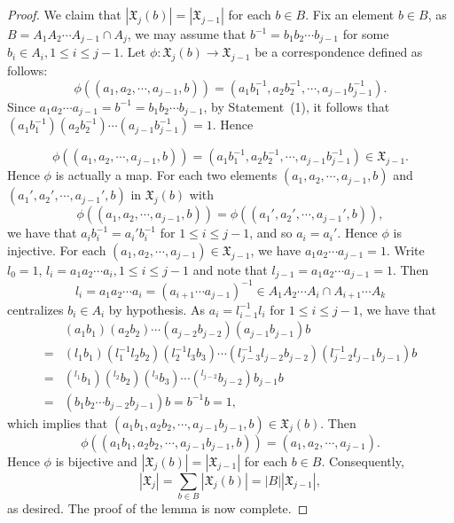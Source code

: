 \documentclass[10pt,a4paper]{amsart}
\newcommand\XX{\mathfrak{X}}
\begin{document}
\begin{proof}
We claim that $|\XX_j(b)|=|\XX_{j-1}|$ for each $b \in B$. Fix an element $b \in B$, as $B=A_1A_2\cdots A_{j-1} \cap A_j$, we may assume that $b^{-1}=b_1b_2\cdots b_{j-1}$ for some $b_i \in A_i, 1\leq i \leq j-1$. Let
$\phi: \XX_j(b) \rightarrow \XX_{j-1}$ be a correspondence defined as follows:
$$\phi((a_1,a_2,\cdots, a_{j-1}, b))=(a_1b_1^{-1}, a_2b_2^{-1}, \cdots, a_{j-1}b_{j-1}^{-1}).$$
Since $a_1a_2\cdots a_{j-1}=b^{-1}=b_1b_2\cdots b_{j-1}$, by Statement~(1), it follows that $(a_1b_1^{-1})(a_2b_2^{-1})\cdots(a_{j-1}b_{j-1}^{-1})=1$. Hence

$$\phi((a_1,a_2,\cdots, a_{j-1}, b))=(a_1b_1^{-1}, a_2b_2^{-1}, \cdots, a_{j-1}b_{j-1}^{-1}) \in \XX_{j-1}.$$
Hence $\phi$ is actually a map. For each two elements $(a_1,a_2,\cdots,a_{j-1},b)$ and $(a_1',a_2',\cdots,a_{j-1}',b)$ in $\XX_j(b)$ with
$$\phi((a_1,a_2,\cdots,a_{j-1},b))=\phi((a_1',a_2',\cdots,a_{j-1}',b)),$$
we have that $a_ib_i^{-1}=a_i'b_i^{-1}$ for $1 \leq i \leq j-1$, and so $a_i=a_i'$. Hence $\phi$ is injective.  For each $(a_1,a_2,\cdots, a_{j-1}) \in \XX_{j-1}$,
we have $a_1a_2\cdots a_{j-1}=1$.
Write $l_0=1$, $l_i=a_1 a_2\cdots a_{i}, 1\leq i \leq j-1$ and note that $l_{j-1}=a_1 a_2\cdots a_{j-1}=1$. Then
$$l_i=a_1a_2\cdots a_{i}=(a_{i+1}\cdots a_{j-1})^{-1} \in A_1A_2\cdots A_i \cap A_{i+1} \cdots A_k$$
centralizes $b_i \in A_i$ by hypothesis.
As $a_{i}=l_{i-1}^{-1}l_{i}$ for $1\leq i \leq j-1$, we have that
$$
\begin{aligned}
&(a_1b_1)(a_2b_2)\cdots (a_{j-2}b_{j-2})(a_{j-1}b_{j-1})b\\
=&(l_1b_1)(l_1^{-1}l_2b_2)(l_2^{-1}l_3b_3) \cdots (l_{j-3}^{-1}l_{j-2}b_{j-2})(l_{j-2}^{-1}l_{j-1}b_{j-1})b\\
=&({}^{l_1}b_1)({}^{l_2}b_2)({}^{l_3}b_3) \cdots ({}^{l_{j-2}}b_{j-2}) b_{j-1}b\\
=&(b_1b_2\cdots b_{j-2}b_{j-1})b=b^{-1}b=1,
\end{aligned}
$$
which implies that $(a_1b_1,a_2b_2,\cdots,a_{j-1}b_{j-1}, b) \in \XX_j(b)$. Then
$$\phi((a_1b_1,a_2b_2,\cdots, a_{j-1}b_{j-1}, b))=(a_1, a_2, \cdots, a_{j-1}).$$
Hence $\phi$ is bijective and $|\XX_j(b)|=|\XX_{j-1}|$ for each $b \in B$. Consequently,
$$|\XX_j|=\sum_{b \in B} |\XX_j(b)|=|B||\XX_{j-1}|,$$
as desired. The proof of the lemma is now complete.
\end{proof}
\end{document}
